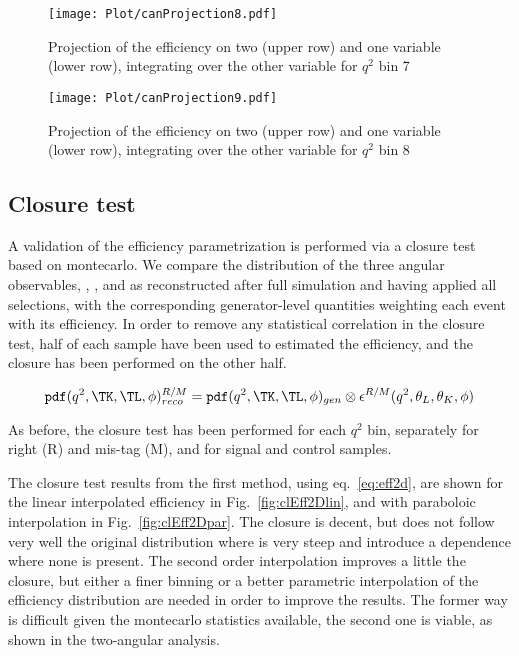 \begin{figure}[hbt]
    \texttt{[image: Plot/canProjection8.pdf]}
    \caption{Projection of the efficiency on two (upper row) and one variable (lower row), integrating over the other variable for $q^2$ bin 7}
    \label{fig:effPro7}
\end{figure}

\begin{figure}[hbt]
    \texttt{[image: Plot/canProjection9.pdf]}
    \caption{Projection of the efficiency on two (upper row) and one variable (lower row), integrating over the other variable for $q^2$ bin 8}
    \label{fig:effPro8}
\end{figure}

\clearpage

\subsection{Closure test}\label{sec:closure}

A validation of the efficiency parametrization is performed via a closure test
based on montecarlo.
We compare the distribution of the three angular
observables, \TK, \TL, and \PHI as reconstructed after full simulation and
having applied all selections, with the corresponding generator-level
quantities weighting each event with its efficiency.
In order to remove any statistical correlation in the closure test, half of
each sample have been used to estimated the efficiency, and the closure has
been performed on the other half.

\begin{equation}\label{eq:effClosure}
    \mathtt{pdf}(q^2,\TK,\TL,\phi)_{reco}^{R/M}=\mathtt{pdf}(q^2,\TK,\TL,\phi)_{gen}\otimes\epsilon^{R/M}(q^2,\theta_L,\theta_K,\phi)
\end{equation}

As before, the closure test has been performed for each $q^2$ bin, separately
for right (R) and mis-tag (M), and for signal and control samples.

The closure test results from the first method, using eq.~\ref{eq:eff2d}, are
shown for the linear interpolated efficiency in Fig.~\ref{fig:clEff2Dlin}, and
with paraboloic interpolation in Fig.~\ref{fig:clEff2Dpar}.
The closure is decent, but does not follow very well the original distribution
where is very steep and introduce a \PHI dependence where none is present.  The
second order interpolation improves a little the closure, but
either a finer binning or a better parametric interpolation of the efficiency
distribution are needed in order to improve the results. The former way is
difficult given the montecarlo statistics available, the second one is viable,
as shown in the two-angular analysis.

